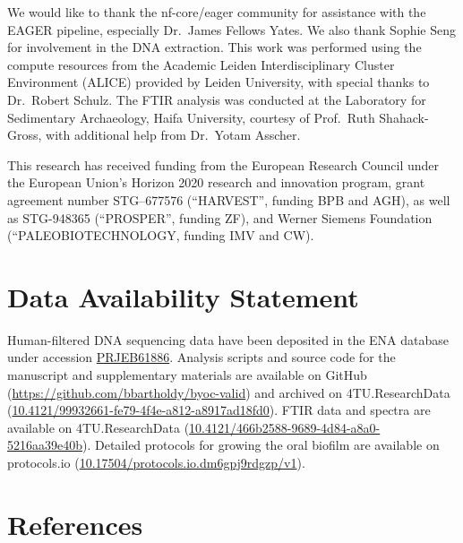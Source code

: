 \documentclass[10pt,a4paper]{article}
\begin{document}
We would like to thank the nf-core/eager community for assistance with
the EAGER pipeline, especially Dr.~James Fellows Yates. We also thank
Sophie Seng for involvement in the DNA extraction. This work was
performed using the compute resources from the Academic Leiden
Interdisciplinary Cluster Environment (ALICE) provided by Leiden
University, with special thanks to Dr.~Robert Schulz. The FTIR analysis
was conducted at the Laboratory for Sedimentary Archaeology, Haifa
University, courtesy of Prof.~Ruth Shahack-Gross, with additional help
from Dr.~Yotam Asscher.

This research has received funding from the European Research Council
under the European Union's Horizon 2020 research and innovation program,
grant agreement number STG--677576 (``HARVEST'', funding BPB and AGH),
as well as STG-948365 (``PROSPER'', funding ZF), and Werner Siemens
Foundation (``PALEOBIOTECHNOLOGY, funding IMV and CW).

\section*{Data Availability
Statement}\label{data-availability-statement}

Human-filtered DNA sequencing data have been deposited in the ENA
database under accession
\href{https://www.ebi.ac.uk/ena/browser/view/PRJEB61886}{PRJEB61886}.
Analysis scripts and source code for the manuscript and supplementary
materials are available on GitHub
(\url{https://github.com/bbartholdy/byoc-valid}) and archived on
4TU.ResearchData
(\href{https://doi.org/10.4121/99932661-fe79-4f4e-a812-a8917ad18fd0}{10.4121/99932661-fe79-4f4e-a812-a8917ad18fd0}).
FTIR data and spectra are available on 4TU.ResearchData
(\href{https://doi.org/10.4121/466b2588-9689-4d84-a8a0-5216aa39e40b}{10.4121/466b2588-9689-4d84-a8a0-5216aa39e40b}).
Detailed protocols for growing the oral biofilm are available on
protocols.io
(\href{https://dx.doi.org/10.17504/protocols.io.dm6gpj9rdgzp/v1}{10.17504/protocols.io.dm6gpj9rdgzp/v1}).

\section*{References}\label{references}

\renewcommand{\bibsection}{}

\end{document}

